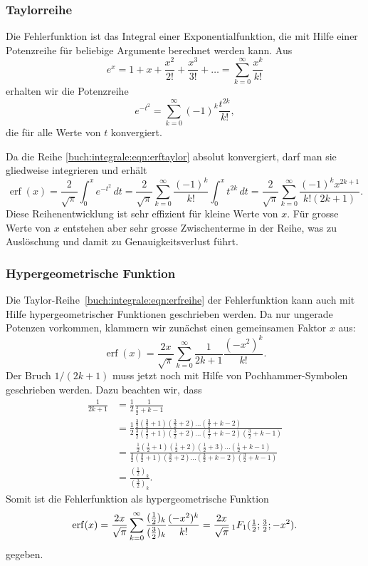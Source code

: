 \subsubsection{Taylorreihe}
Die Fehlerfunktion ist das Integral einer Exponentialfunktion, die mit
Hilfe einer Potenzreihe für beliebige Argumente berechnet werden kann.
Aus
\[
e^x
=
1+x+\frac{x^2}{2!}+\frac{x^3}{3!} + \dots
=
\sum_{k=0}^\infty \frac{x^k}{k!}
\]
erhalten wir die Potenzreihe
\begin{equation}
e^{-t^2}
=
\sum_{k=0}^{\infty}
(-1)^k
\frac{t^{2k}}{k!},
\label{buch:integrale:eqn:erftaylor}
\end{equation}
die für alle Werte von $t$ konvergiert.

Da die Reihe
\eqref{buch:integrale:eqn:erftaylor}
absolut konvergiert, darf man sie gliedweise integrieren und erhält
\begin{equation}
\operatorname{erf}(x)
=
\frac{2}{\sqrt{\pi}}
\int_0^x
e^{-t^2}\,dt
=
\frac{2}{\sqrt{\pi}}
\sum_{k=0}^\infty \frac{(-1)^k}{k!}\int_0^x t^{2k}\,dt
=
\frac{2}{\sqrt{\pi}}
\sum_{k=0}^\infty \frac{(-1)^kx^{2k+1}}{k!(2k+1)}.
\label{buch:integrale:eqn:erfreihe}
\end{equation}
Diese Reihenentwicklung ist sehr effizient für kleine Werte von $x$.
Für grosse Werte von $x$ entstehen aber sehr grosse Zwischenterme in der
Reihe, was zu Auslöschung und damit zu Genauigkeitsverlust führt.

\subsubsection{Hypergeometrische Funktion}
Die Taylor-Reihe~\eqref{buch:integrale:eqn:erfreihe} der Fehlerfunktion
kann auch mit Hilfe hypergeometrischer Funktionen geschrieben werden.
Da nur ungerade Potenzen vorkommen, klammern wir zunächst einen gemeinsamen
Faktor $x$ aus:
\[
\operatorname{erf}(x)
=
\frac{2x}{\sqrt{\pi}}
\sum_{k=0}^\infty
\frac{1}{2k+1}
\frac{(-x^2)^k}{k!}.
\]
Der Bruch $1/(2k+1)$  muss jetzt noch mit Hilfe von Pochhammer-Symbolen
geschrieben werden.
Dazu beachten wir, dass
\begin{align*}
\frac{1}{2k+1} 
&=
\frac12
\frac{1}{\frac32+k-1}
\\
&=
\frac12
\frac{
\frac32(\frac32+1)(\frac32+2)\dots(\frac32+k-2)\phantom{(\frac32+k-1)}
}{
\frac32(\frac32+1)(\frac32+2)\dots(\frac32+k-2)(\frac32+k-1)
}
\\
&=
\frac{
\frac12(\frac12+1)(\frac12+2)(\frac12+3)\dots(\frac12+k-1)
}{
\frac32(\frac32+1)(\frac32+2)\dots(\frac32+k-2)(\frac32+k-1)
}
\\
&=
\frac{(\frac12)_k}{(\frac32)_k}.
\end{align*}
Somit ist die Fehlerfunktion als hypergeometrische Funktion
\[
\operatorname{erf}(x)
=
\frac{2x}{\sqrt{\pi}}\sum_{k=0}^\infty
\frac{(\frac12)_k}{(\frac32)_k}\frac{(-x^2)^k}{k!}
=
\frac{2x}{\sqrt{\pi}}\,
\mathstrut_1F_1({\textstyle\frac12};{\textstyle\frac32};-x^2).
\]
gegeben.

